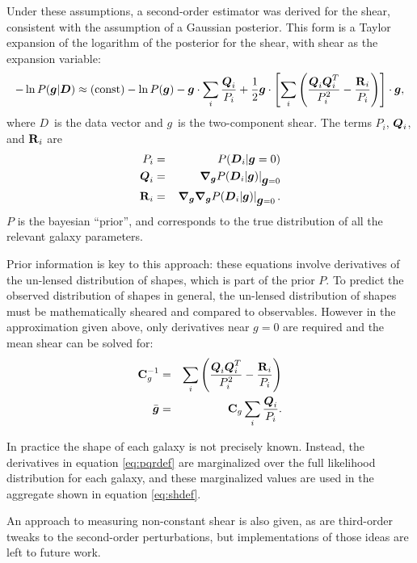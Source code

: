 \documentclass[12pt,preprint]{aastex}
\newcommand{\vecg}{\mbox{\boldmath $g$}}
\newcommand{\vecD}{\mbox{\boldmath $D$}}
\newcommand{\vecQ}{\mbox{\boldmath $Q$}}
\newcommand{\matR}{\mbox{$\bf R$}}
\newcommand{\matC}{\mbox{$\bf C$}}
\newcommand{\bnabg}{ \boldsymbol{\nabla_g}}
\begin{document}
Under these assumptions, a second-order estimator was derived for the shear,
consistent with the assumption of a Gaussian posterior.  This form is a Taylor
expansion of the logarithm of the posterior for the shear, with shear as the
expansion variable:
\begin{equation} \label{eq:pexpand}
-\ln P(\vecg | \vecD) \approx {(\rm const)} - \ln P(\vecg) - \vecg \cdot \sum_i
    \frac{\vecQ_i}{P_i}
    + \frac{1}{2} \vecg \cdot \left[ \sum_i \left(\frac{\vecQ_i \vecQ^T_i}{P_i^2}
    - \frac{\matR_i}{P_i}\right) \right] \cdot \vecg,
\end{equation}
where \vecD\ is the data vector and \vecg\ is the two-component shear.  The
terms $P_i$, $\vecQ_i$, and $\matR_i$ are 
\begin{eqnarray} \label{eq:pqrdef}
P_i     & = & P(\vecD_i | \vecg=0) \nonumber \\
\vecQ_i & = & \left. \bnabg P(\vecD_i | \vecg)\right|_{\vecg=0} \\
\matR_i & = & \left. \bnabg \bnabg P(\vecD_i | \vecg)\right|_{\vecg=0}. \nonumber
\end{eqnarray}
$P$ is the bayesian ``prior'', and corresponds to the true distribution
of all the relevant galaxy parameters.

Prior information is key to this approach: these equations involve derivatives
of the un-lensed distribution of shapes, which is part of the prior $P$. To
predict the observed distribution of shapes in general, the un-lensed
distribution of shapes must be mathematically sheared and compared to
observables.  However in the approximation given above, only derivatives near
$g=0$ are required and the mean shear can be solved for:
\begin{eqnarray} \label{eq:shdef}
\matC_g^{-1} & = & \sum_i \left(\frac{\vecQ_i \vecQ^T_i}{P_i^2} - \frac{\matR_i}{P_i}\right) \\
\bar{\vecg} & = &  \matC_g \sum_i \frac{\vecQ_i}{P_i}.
\end{eqnarray}

In practice the shape of each galaxy is not precisely known. Instead, the
derivatives in equation \ref{eq:pqrdef} are marginalized over the full
likelihood distribution for each galaxy, and these marginalized values are used
in the aggregate shown in equation \ref{eq:shdef}.  

An approach to measuring non-constant shear is also given, as are third-order
tweaks to the second-order perturbations, but implementations of those ideas
are left to future work.
\end{document}
